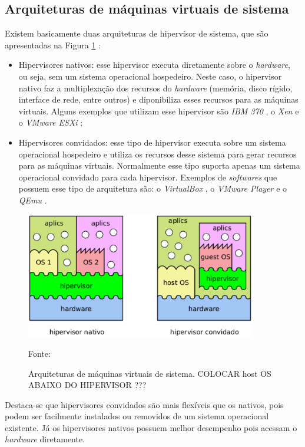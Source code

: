 \subsection{Arquiteturas de máquinas virtuais de sistema}
\label{section:virtarquit}

Existem basicamente duas arquiteturas de hipervisor de sistema, que são apresentadas na Figura \ref{fig:vms_arquiteturas} \cite{maziero2013}:
\begin{itemize}
 \item Hipervisores nativos: esse hipervisor executa diretamente sobre o \textit{hardware}, ou seja, sem um sistema operacional
 hospedeiro. Neste caso, o hipervisor nativo faz a multiplexação dos recursos do \textit{hardware} (memória, disco rígido, interface de rede, 
 entre outros) e diponibiliza esses recursos para as máquinas virtuais. Alguns exemplos que utilizam esse hipervisor são 
 \textit{IBM 370} \cite{ibm370}, o \textit{Xen} \cite{xen} e o \textit{VMware ESXi} \cite{vmwareesxi};
 \item Hipervisores convidados: esse tipo de hipervisor executa sobre um sistema operacional hospedeiro e utiliza os recursos desse sistema 
 para gerar recursos para as máquinas virtuais. Normalmente esse tipo suporta apenas um sistema operacional convidado para cada 
 hipervisor. Exemplos de \textit{softwares} que possuem esse tipo de arquitetura são: o \textit{VirtualBox} \cite{virtualbox}, 
 o \textit{VMware Player} \cite{vmwareplayer} e o \textit{QEmu} \cite{qemu}.
\end{itemize}

\begin{figure}[vms_arquiteturas]
 \centering
 \includegraphics[width=380px]{img/vms_arquiteturas.eps}
 \caption{Arquiteturas de máquinas virtuais de sistema. COLOCAR host OS ABAIXO DO HIPERVISOR ???}
 \label{fig:vms_arquiteturas}
 Fonte: \citet{maziero2013}
\end{figure}

Destaca-se que hipervisores convidados são mais flexíveis que os nativos, pois podem ser facilmente instalados ou removidos de um sistema
operacional existente. Já os hipervisores nativos possuem melhor desempenho pois acessam o \textit{hardware} diretamente.

